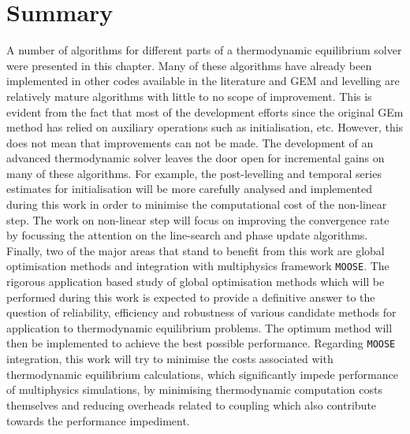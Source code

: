 	
	
\section{Summary}	
	A number of algorithms for different parts of a thermodynamic equilibrium solver were presented in this chapter. Many of these algorithms have already been implemented in other codes available in the literature and GEM and levelling are relatively mature algorithms with little to no scope of improvement. This is evident from the fact that most of the development efforts since the original GEm method has relied on auxiliary operations such as initialisation, etc. However, this does not mean that improvements can not be made.  The development of an advanced thermodynamic solver leaves the door open for incremental gains on many of these algorithms. 
For example, the post-levelling and temporal series estimates for initialisation will be more carefully analysed and implemented during this work in order to minimise the computational cost of the non-linear step. The work on non-linear step will focus on improving the convergence rate by focussing the attention on the line-search and phase update algorithms. Finally, two of the major areas that stand to benefit from this work are global optimisation methods and integration with multiphysics framework \texttt{MOOSE}. The rigorous application based study of global optimisation methods which will be performed during this work is expected to provide a definitive answer to the question of reliability, efficiency and robustness of various candidate methods for application to thermodynamic equilibrium problems. The optimum method will then be implemented to achieve the best possible performance. Regarding \texttt{MOOSE} integration, this work will try to minimise the costs associated with thermodynamic equilibrium calculations, which significantly impede performance of multiphysics simulations, by minimising thermodynamic computation costs themselves  and reducing overheads  related to coupling which also contribute towards the performance impediment. 